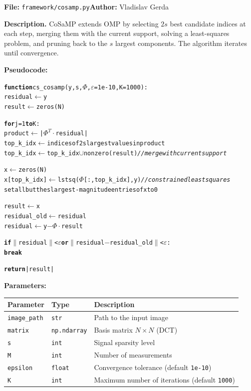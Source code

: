 \documentclass[12pt,a4paper]{article}
\newcommand{\cs}[1]{\texttt{#1}}          %
\begin{document}
\textbf{File:} \cs{framework/cosamp.py}\quad\textbf{Author:} Vladislav Gerda

\textbf{Description.}  CoSaMP extends OMP by selecting $2s$ best candidate
indices at each step, merging them with the current support, solving a
least-squares problem, and pruning back to the $s$ largest components.  The
algorithm iterates until convergence.

\textbf{Pseudocode:}

\begin{alltt}
\textbf{function} cs\_cosamp(y, s, \(\Phi\), \(\varepsilon\)=1e-10, K=1000):
    residual \(\leftarrow\) y
    result   \(\leftarrow\) zeros(N)

    \textbf{for} j = 1 \textbf{to} K:
        product   \(\leftarrow\) |\(\Phi^T \cdot\) residual|
        top\_k\_idx \(\leftarrow\) indices of 2s largest values in product
        top\_k\_idx \(\leftarrow\) top\_k\_idx \(\cup\) nonzero(result)  \textit{// merge with current support}

        x           \(\leftarrow\) zeros(N)
        x[top\_k\_idx] \(\leftarrow\) lstsq(\(\Phi\)[:, top\_k\_idx], y)  \textit{// constrained least squares}
        set all but the s largest-magnitude entries of x to 0

        result       \(\leftarrow\) x
        residual\_old \(\leftarrow\) residual
        residual     \(\leftarrow\) y \(-\) \(\Phi \cdot\) result

        \textbf{if} \(\|\)residual\(\|\) < \(\varepsilon\)  \textbf{or}  \(\|\)residual \(-\) residual\_old\(\|\) < \(\varepsilon\):
            \textbf{break}

    \textbf{return} |result|
\end{alltt}

\textbf{Parameters:}

\begin{center}
\begin{tabular}{lll}
  \toprule
  Parameter   & Type            & Description \\
  \midrule
  \cs{image\_path} & \cs{str}       & Path to the input image \\
  \cs{matrix}      & \cs{np.ndarray}& Basis matrix $N \times N$ (DCT) \\
  \cs{s}           & \cs{int}       & Signal sparsity level \\
  \cs{M}           & \cs{int}       & Number of measurements \\
  \cs{epsilon}     & \cs{float}     & Convergence tolerance (default \cs{1e-10}) \\
  \cs{K}           & \cs{int}       & Maximum number of iterations (default \cs{1000}) \\
  \bottomrule
\end{tabular}
\end{center}
\end{document}
